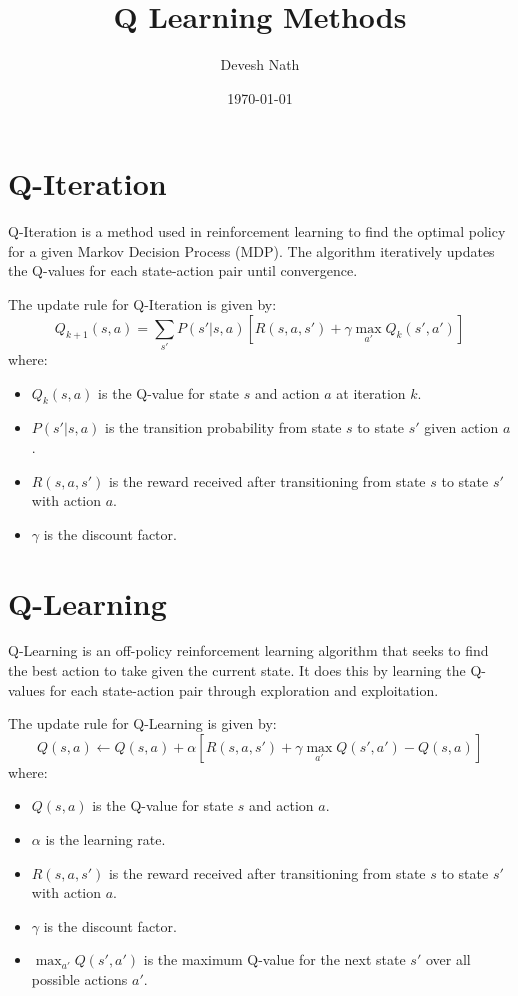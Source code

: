 \documentclass{article}
\begin{document}
\title{Q Learning Methods}
\author{Devesh Nath}
\date{\today}

\maketitle

\section{Q-Iteration}

Q-Iteration is a method used in reinforcement learning to find the optimal policy for a given Markov Decision Process (MDP). The algorithm iteratively updates the Q-values for each state-action pair until convergence.

The update rule for Q-Iteration is given by:
\[
Q_{k+1}(s, a) = \sum_{s'} P(s' | s, a) \left[ R(s, a, s') + \gamma \max_{a'} Q_k(s', a') \right]
\]
where:
\begin{itemize}
    \item \( Q_k(s, a) \) is the Q-value for state \( s \) and action \( a \) at iteration \( k \).
    \item \( P(s' | s, a) \) is the transition probability from state \( s \) to state \( s' \) given action \( a \).
    \item \( R(s, a, s') \) is the reward received after transitioning from state \( s \) to state \( s' \) with action \( a \).
    \item \( \gamma \) is the discount factor.
\end{itemize}

\section{Q-Learning}

Q-Learning is an off-policy reinforcement learning algorithm that seeks to find the best action to take given the current state. It does this by learning the Q-values for each state-action pair through exploration and exploitation.

The update rule for Q-Learning is given by:
\[ 
Q(s, a) \leftarrow Q(s, a) + \alpha \left[ R(s, a, s') + \gamma \max_{a'} Q(s', a') - Q(s, a) \right]
\]
where:
\begin{itemize}
    \item \( Q(s, a) \) is the Q-value for state \( s \) and action \( a \).
    \item \( \alpha \) is the learning rate.
    \item \( R(s, a, s') \) is the reward received after transitioning from state \( s \) to state \( s' \) with action \( a \).
    \item \( \gamma \) is the discount factor.
    \item \( \max_{a'} Q(s', a') \) is the maximum Q-value for the next state \( s' \) over all possible actions \( a' \).
\end{itemize}
\end{document}

